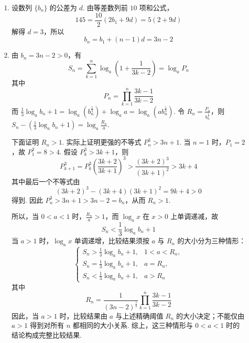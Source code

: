 \documentclass[UTF8,a4paper,oneside,11pt]{ctexbook}
\begin{document}
\begin{solution}
\begin{enumerate}
\item 设数列 \(\{b_{n}\}\) 的公差为 \(d\). 由等差数列前 \(10\) 项和公式，
\[
145=\frac{10}{2}\left(2b_{1}+9d\right)=5(2+9d)
\]
解得 \(d=3\)，所以
\[
b_{n}=b_{1}+(n-1)d=3n-2
\]

\item 由 \(b_{n}=3n-2>0\)，有
\[
S_{n}=\sum_{k=1}^{n}\log_{a}\left(1+\frac{1}{3k-2}\right)=\log_{a}P_{n}
\]
其中
\[
P_{n}=\prod_{k=1}^{n}\frac{3k-1}{3k-2}
\]
而 \(\frac{1}{3}\log_{a}b_{n}+1=\log_{a}\left(b_{n}^{\frac{1}{3}}\right)+\log_{a}a=\log_{a}\left(ab_{n}^{\frac{1}{3}}\right)\). 令 \(R_{n}=\frac{P_{n}}{b_{n}^{\frac{1}{3}}}\)，则 \(S_{n}-\left(\frac{1}{3}\log_{a}b_{n}+1\right)=\log_{a}\frac{R_{n}}{a}\).

下面证明 \(R_{n}>1\). 实际上证明更强的不等式 \(P_{n}^{3}>3n+1\). 当 \(n=1\) 时，\(P_{1}=2\)，故 \(P_{1}^{3}=8>4\). 假设 \(P_{k}^{3}>3k+1\)，则
\[
P_{k+1}^{3}=P_{k}^{3}\left(\frac{3k+2}{3k+1}\right)^{3}>\frac{(3k+2)^{3}}{(3k+1)^{2}}>3k+4
\]
其中最后一个不等式由
\[
(3k+2)^{3}-(3k+4)(3k+1)^{2}=9k+4>0
\]
得到. 因此 \(P_{n}^{3}>3n+1>3n-2=b_{n}\)，从而 \(R_{n}>1\).

所以，当 \(0<a<1\) 时，\(\frac{R_{n}}{a}>1\)，而 \(\log_{a}x\) 在 \(x>0\) 上单调递减，故
\[
S_{n}<\frac{1}{3}\log_{a}b_{n}+1
\]
当 \(a>1\) 时，\(\log_{a}x\) 单调递增，比较结果须按 \(a\) 与 \(R_{n}\) 的大小分为三种情形：
\[
\begin{cases}
S_{n}>\frac{1}{3}\log_{a}b_{n}+1,&1<a<R_{n},\\
S_{n}=\frac{1}{3}\log_{a}b_{n}+1,&a=R_{n},\\
S_{n}<\frac{1}{3}\log_{a}b_{n}+1,&a>R_{n}
\end{cases}
\]
其中
\[
R_{n}=\frac{1}{(3n-2)^{\frac{1}{3}}}\prod_{k=1}^{n}\frac{3k-1}{3k-2}
\]
因此，当 \(a>1\) 时，比较结果由 \(a\) 与上述精确阈值 \(R_{n}\) 的大小决定；不能仅由 \(a>1\) 得到对所有 \(n\) 都相同的大小关系. 综上，这三种情形与 \(0<a<1\) 时的结论构成完整比较结果.
\end{enumerate}
\end{solution}

\end{document}
